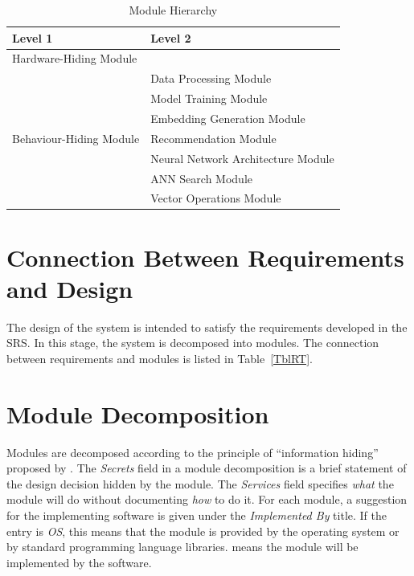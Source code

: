 \documentclass[12pt, titlepage]{article}
\begin{document}
\begin{table}[h!]
\centering
\begin{tabular}{p{} p{}}
\toprule
\textbf{Level 1} & \textbf{Level 2}\\
\midrule

{Hardware-Hiding Module} & ~ \\
\midrule

\multirow{7}{0.3\textwidth}{Behaviour-Hiding Module} & Data Processing Module\\
& Model Training Module\\
& Embedding Generation Module\\
& Recommendation Module\\
\midrule

\multirow{3}{0.3\textwidth}{Software Decision Module} & {Neural Network Architecture Module}\\
& ANN Search Module\\
& Vector Operations Module\\
\bottomrule

\end{tabular}
\caption{Module Hierarchy}
\label{TblMH}
\end{table}

\section{Connection Between Requirements and Design} \label{SecConnection}

The design of the system is intended to satisfy the requirements developed in
the SRS. In this stage, the system is decomposed into modules. The connection
between requirements and modules is listed in Table~\ref{TblRT}.

\section{Module Decomposition} \label{SecMD}

Modules are decomposed according to the principle of ``information hiding''
proposed by \citet{ParnasEtAl1984}. The \emph{Secrets} field in a module
decomposition is a brief statement of the design decision hidden by the
module. The \emph{Services} field specifies \emph{what} the module will do
without documenting \emph{how} to do it. For each module, a suggestion for the
implementing software is given under the \emph{Implemented By} title. If the
entry is \emph{OS}, this means that the module is provided by the operating
system or by standard programming language libraries.  \emph{\progname{}} means the
module will be implemented by the \progname{} software.
\end{document}
